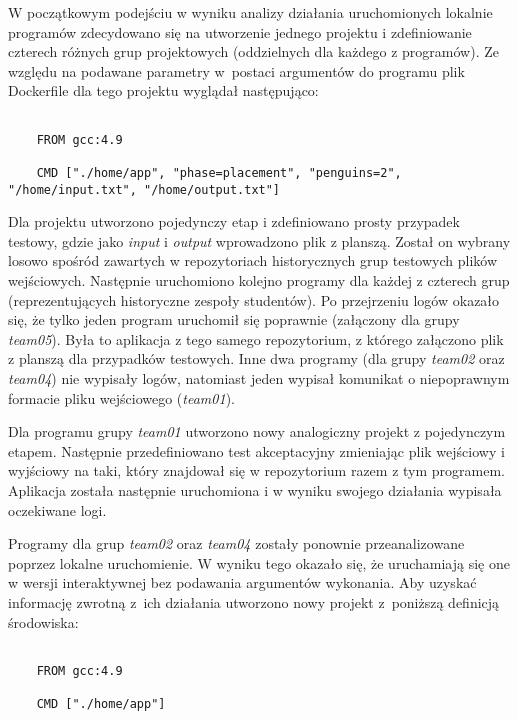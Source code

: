 W początkowym podejściu w wyniku analizy działania uruchomionych lokalnie programów zdecydowano się na utworzenie jednego projektu i zdefiniowanie czterech różnych grup projektowych (oddzielnych dla każdego z programów).
Ze względu na podawane parametry w~postaci argumentów do programu plik Dockerfile dla tego projektu wyglądał następująco:

{\selectfont
\tiny
\begin{lstlisting}

    FROM gcc:4.9

    CMD ["./home/app", "phase=placement", "penguins=2", "/home/input.txt", "/home/output.txt"]

\end{lstlisting}
}

Dla projektu utworzono pojedynczy etap i zdefiniowano prosty przypadek testowy, gdzie jako \textit{input} i \textit{output} wprowadzono plik z planszą.
Został on wybrany losowo spośród zawartych w repozytoriach historycznych grup testowych plików wejściowych.
Następnie uruchomiono kolejno programy dla każdej z czterech grup (reprezentujących historyczne zespoły studentów).
Po przejrzeniu logów okazało się, że tylko jeden program uruchomił się poprawnie (załączony dla grupy \textit{team05}).
Była to aplikacja z tego samego repozytorium, z którego załączono plik z planszą dla przypadków testowych.
Inne dwa programy (dla grupy \textit{team02} oraz \textit{team04}) nie wypisały logów, natomiast jeden wypisał komunikat o niepoprawnym formacie pliku wejściowego (\textit{team01}).

Dla programu grupy \textit{team01} utworzono nowy analogiczny projekt z pojedynczym etapem.
Następnie przedefiniowano test akceptacyjny zmieniając plik wejściowy i wyjściowy na taki, który znajdował się w repozytorium razem z tym programem.
Aplikacja została następnie uruchomiona i w wyniku swojego działania wypisała oczekiwane logi.

Programy dla grup \textit{team02} oraz \textit{team04} zostały ponownie przeanalizowane poprzez lokalne uruchomienie.
W wyniku tego okazało się, że uruchamiają się one w wersji interaktywnej bez podawania argumentów wykonania.
Aby uzyskać informację zwrotną z~ich działania utworzono nowy projekt z~poniższą definicją środowiska:

{\selectfont
\tiny
\begin{lstlisting}

    FROM gcc:4.9

    CMD ["./home/app"]

\end{lstlisting}
}

